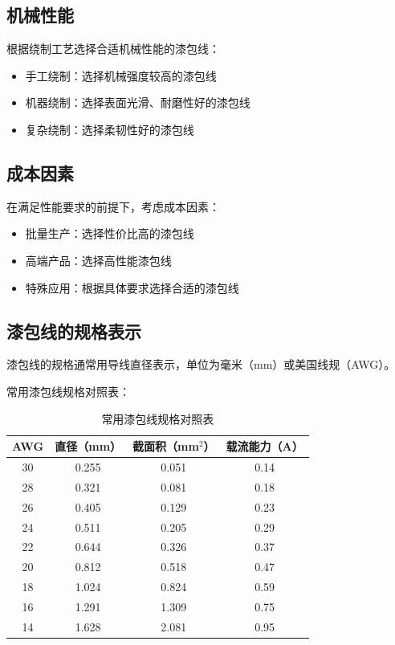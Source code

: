 \documentclass[12pt,UTF8]{ctexbook}
\begin{document}
\subsection{机械性能}

根据绕制工艺选择合适机械性能的漆包线：

\begin{itemize}[leftmargin=2cm]
    \item 手工绕制：选择机械强度较高的漆包线
    \item 机器绕制：选择表面光滑、耐磨性好的漆包线
    \item 复杂绕制：选择柔韧性好的漆包线
\end{itemize}

\subsection{成本因素}

在满足性能要求的前提下，考虑成本因素：

\begin{itemize}[leftmargin=2cm]
    \item 批量生产：选择性价比高的漆包线
    \item 高端产品：选择高性能漆包线
    \item 特殊应用：根据具体要求选择合适的漆包线
\end{itemize}

\subsection{漆包线的规格表示}

漆包线的规格通常用导线直径表示，单位为毫米（mm）或美国线规（AWG）。

常用漆包线规格对照表：

\begin{table}[H]
    \centering
    \begin{tabular}{|c|c|c|c|}
        \hline
        \textbf{AWG} & \textbf{直径（mm）} & \textbf{截面积（mm$^2$）} & \textbf{载流能力（A）} \\
        \hline
        30 & 0.255 & 0.051 & 0.14 \\
        \hline
        28 & 0.321 & 0.081 & 0.18 \\
        \hline
        26 & 0.405 & 0.129 & 0.23 \\
        \hline
        24 & 0.511 & 0.205 & 0.29 \\
        \hline
        22 & 0.644 & 0.326 & 0.37 \\
        \hline
        20 & 0.812 & 0.518 & 0.47 \\
        \hline
        18 & 1.024 & 0.824 & 0.59 \\
        \hline
        16 & 1.291 & 1.309 & 0.75 \\
        \hline
        14 & 1.628 & 2.081 & 0.95 \\
        \hline
    \end{tabular}
    \caption{常用漆包线规格对照表}
    \label{tab:enamel_wire_spec}
\end{table}
\end{document}
